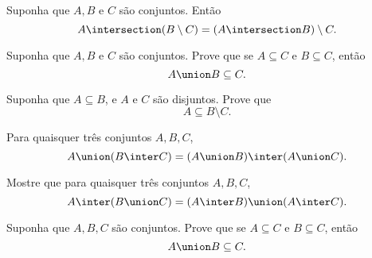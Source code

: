 \begin{exercise}
	Suponha que $A, B$ e $C$ são conjuntos. Então 
    $$
        A \intersection (B \setminus C) = (A \intersection B) \setminus C.
    $$
\end{exercise}

\begin{exercise}
	Suponha que $A, B$ e $C$ são conjuntos. Prove que se $A \subseteq C$ e $B \subseteq C$, então 
    $$
        A \union B \subseteq C.
    $$
\end{exercise}

\begin{exercise}
    Suponha que $A \subseteq B$, e $A$ e $C$ são disjuntos. Prove que 
    $$
        A \subseteq B \setminus C.
    $$
\end{exercise}

\begin{exercise}
    Para quaisquer três conjuntos $A, B, C$, 
    $$
        A \union (B \inter C) = (A \union B) \inter (A \union C).
    $$
\end{exercise}

\begin{homework}
    Mostre que para quaisquer três conjuntos $A, B, C$, 
    $$ 
        A \inter (B \union C) = (A \inter B) \union (A \inter C).
    $$
\end{homework}

\begin{homework}
    Suponha que $A,B,C$ são conjuntos. Prove que se $A \subseteq C$ e $B \subseteq C$, então 
    $$
        A \union B \subseteq C.
    $$
\end{homework}
